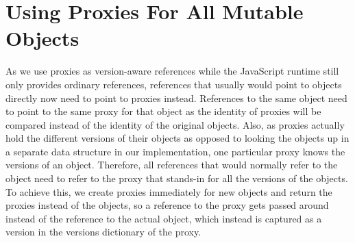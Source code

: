 % 


\section{Using Proxies For All Mutable Objects}

As we use proxies as version-aware references while the JavaScript runtime still only provides ordinary references, references that usually would point to objects directly now need to point to proxies instead. 
References to the same object need to point to the same proxy for that object as the identity of proxies will be compared instead of the identity of the original objects.
Also, as proxies actually hold the different versions of their objects as opposed to looking the objects up in a separate data structure in our implementation, one particular proxy knows the versions of an object.
Therefore, all references that would normally refer to the object need to refer to the proxy that stands-in for all the versions of the objects.
To achieve this, we create proxies immediately for new objects and return the proxies instead of the objects, so a reference to the proxy gets passed around instead of the reference to the actual object, which instead is captured as a version in the versions dictionary of the proxy.

